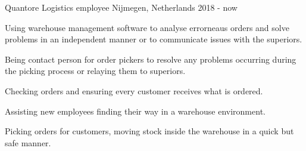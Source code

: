 \begin{cventries}
\cventry
    {Quantore} %
    {Logistics employee} %
    {Nijmegen, Netherlands} %
    {2018 - now} %
    {
      \begin{cvitems}
        \item {Using warehouse management software to analyse errorneaus orders and solve problems in an independent manner or to communicate issues with the superiors.}
        \item {Being contact person for order pickers to resolve any problems occurring during the picking process or relaying them to superiors.}
        \item {Checking orders and ensuring every customer receives what is ordered.}
        \item {Assisting new employees finding their way in a warehouse environment.}
        \item {Picking orders for customers, moving stock inside the warehouse in a quick but safe manner.}
      \end{cvitems}
    }
\end{cventries}
